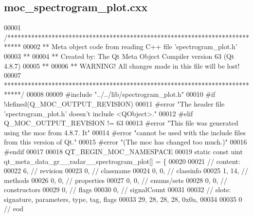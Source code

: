 \subsection{moc\+\_\+spectrogram\+\_\+plot.\+cxx}
\label{moc__spectrogram__plot_8cxx_source}

\begin{DoxyCode}
00001 \textcolor{comment}{/****************************************************************************}
00002 \textcolor{comment}{** Meta object code from reading C++ file 'spectrogram\_plot.h'}
00003 \textcolor{comment}{**}
00004 \textcolor{comment}{** Created by: The Qt Meta Object Compiler version 63 (Qt 4.8.7)}
00005 \textcolor{comment}{**}
00006 \textcolor{comment}{** WARNING! All changes made in this file will be lost!}
00007 \textcolor{comment}{*****************************************************************************/}
00008 
00009 \textcolor{preprocessor}{#include "../../lib/spectrogram\_plot.h"}
00010 \textcolor{preprocessor}{#if !defined(Q\_MOC\_OUTPUT\_REVISION)}
00011 \textcolor{preprocessor}{#error "The header file 'spectrogram\_plot.h' doesn't include <QObject>."}
00012 \textcolor{preprocessor}{#elif Q\_MOC\_OUTPUT\_REVISION != 63}
00013 \textcolor{preprocessor}{#error "This file was generated using the moc from 4.8.7. It"}
00014 \textcolor{preprocessor}{#error "cannot be used with the include files from this version of Qt."}
00015 \textcolor{preprocessor}{#error "(The moc has changed too much.)"}
00016 \textcolor{preprocessor}{#endif}
00017 
00018 QT\_BEGIN\_MOC\_NAMESPACE
00019 \textcolor{keyword}{static} \textcolor{keyword}{const} uint qt_meta_data_gr__radar__spectrogram_plot[] = \{
00020 
00021  \textcolor{comment}{// content:}
00022        6,       \textcolor{comment}{// revision}
00023        0,       \textcolor{comment}{// classname}
00024        0,    0, \textcolor{comment}{// classinfo}
00025        1,   14, \textcolor{comment}{// methods}
00026        0,    0, \textcolor{comment}{// properties}
00027        0,    0, \textcolor{comment}{// enums/sets}
00028        0,    0, \textcolor{comment}{// constructors}
00029        0,       \textcolor{comment}{// flags}
00030        0,       \textcolor{comment}{// signalCount}
00031 
00032  \textcolor{comment}{// slots: signature, parameters, type, tag, flags}
00033       29,   28,   28,   28, 0x0a,
00034 
00035        0        \textcolor{comment}{// eod}

\end{DoxyCode}

